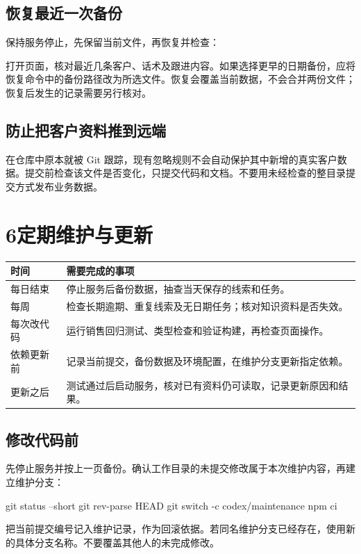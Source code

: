 \documentclass[UTF8,fontset=fandol,zihao=5,a4paper]{ctexart}
\newcommand{\code}[1]{\texttt{\detokenize{#1}}}
\begin{document}
\subsection*{恢复最近一次备份}
保持服务停止，先保留当前文件，再恢复并检查：
打开页面，核对最近几条客户、话术及跟进内容。如果选择更早的日期备份，应将恢复命令中的备份路径改为所选文件。恢复会覆盖当前数据，不会合并两份文件；恢复后发生的记录需要另行核对。

\subsection*{防止把客户资料推到远端}
\code{data/app-data.json} 在仓库中原本就被 Git 跟踪，现有忽略规则不会自动保护其中新增的真实客户数据。提交前检查该文件是否变化，只提交代码和文档。不要用未经检查的整目录提交方式发布业务数据。

\newpage
\section*{6\quad 定期维护与更新}
\par\noindent
\begin{tabularx}{\linewidth}{@{}lY@{}}
\toprule
时间 & 需要完成的事项 \\
\midrule
每日结束 & 停止服务后备份数据，抽查当天保存的线索和任务。\\
每周 & 检查长期逾期、重复线索及无日期任务；核对知识资料是否失效。\\
每次改代码 & 运行销售回归测试、类型检查和验证构建，再检查页面操作。\\
依赖更新前 & 记录当前提交，备份数据及环境配置，在维护分支更新指定依赖。\\
更新之后 & 测试通过后启动服务，核对已有资料仍可读取，记录更新原因和结果。\\
\bottomrule
\end{tabularx}
\par

\subsection*{修改代码前}
先停止服务并按上一页备份。确认工作目录的未提交修改属于本次维护内容，再建立维护分支：
\begin{shell}
git status --short
git rev-parse HEAD
git switch -c codex/maintenance
npm ci
\end{shell}
把当前提交编号记入维护记录，作为回滚依据。若同名维护分支已经存在，使用新的具体分支名称。不要覆盖其他人的未完成修改。
\end{document}
